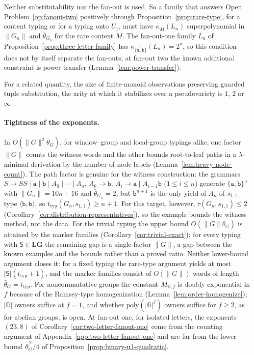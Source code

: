 Neither substitutability nor the fan-out is used.  So a family that answers
Open Problem~\ref{op:fanout-two} positively through
Proposition~\ref{prop:rare-type}, for a content typing or for a typing onto
$U_1$, must have $\kappa_{\overline M}(L_n)$ superpolynomial in $\|G_n\|$ and
$\bar\theta_{G_n}$ for the rare content $M$.  The fan-out-one family $L_n$ of
Proposition~\ref{prop:three-letter-family} has $\kappa_{\overline{\{\mathtt a,\mathtt b\}}}(L_n)=2^n$,
so this condition does not by itself separate the fan-outs; at fan-out two the
known additional constraint is power transfer
(Lemma~\ref{lem:power-transfer}).

For a related quantity, the size of finite-monoid observations preserving
guarded tuple substitution, the arity at which it stabilizes over a
pseudovariety is $1$, $2$ or $\infty$ \cite{KuriyamaSCL2026}.

\paragraph{Tightness of the exponents.}
In $O(\|G\|^2\bar\theta_G)$, for window--group and local-group typings alike,
one factor $\|G\|$ counts the witness words and the other bounds root-to-leaf
paths in a $\lambda$-minimal derivation by the number of node labels
(Lemma~\ref{lem:heavy-node-count}).  The path factor is genuine for the witness
construction: the grammars $S\to SS\mid\mathtt a\mid\mathtt b\mid A_0\mid\cdots\mid A_n$,
$A_0\to\mathtt b$, $A_i\to\mathtt a\mid A_{i-1}\mathtt b$ ($1\le i\le n$) generate
$\{\mathtt a,\mathtt b\}^+$ with $\|G_n\|=10n+16$ and $\bar\theta_{G_n}=2$, but
$\mathtt b^{n+1}$ is the only yield of $A_n$ of $s_{1,1}$-type
$\langle\mathtt b,\mathtt b\rangle$, so $t_{\mathrm{typ}}(G_n,s_{1,1})\ge n+1$.  For this
target, however, $\tau(G_n,s_{1,1})\le2$
(Corollary~\ref{cor:distribution-representatives}), so the example bounds the
witness method, not the data.  For the trivial typing the upper bound
$O(\|G\|\bar\theta_G)$ is attained by the marker families
(Corollary~\ref{cor:trivial-exact}); for
every typing with $\mathsf S\in\mathbf{LG}$ the remaining gap is a single factor
$\|G\|$, a gap between the known examples and the bounds rather than a proved
ratio.  Neither lower-bound argument closes it: for a fixed typing the
rare-type argument yields at most $|\mathsf S|(t_{\mathrm{typ}}+1)$, and the marker
families consist of $O(\|G\|)$ words of length $\bar\theta_G=t_{\mathrm{typ}}$.
For noncommutative
groups the constant $M_{\mathbb G,f}$ is doubly exponential in $f$ because of the
Ramsey-type homogenization (Lemma~\ref{lem:order-homogenize}); $|\mathbb G|$ owners suffice
at $f=1$, and whether $\mathrm{poly}(|\mathbb G|^f)$ owners suffice for $f\ge2$, as for
abelian groups, is open.  At fan-out one, for isolated letters, the exponents
$(23,8)$ of Corollary~\ref{cor:two-letter-fanout-one} come from the counting
argument of Appendix~\ref{app:two-letter-fanout-one} and are far from the lower
bound $\bar\theta_G^{\,2}/4$ of Proposition~\ref{prop:binary-u1-quadratic}.
